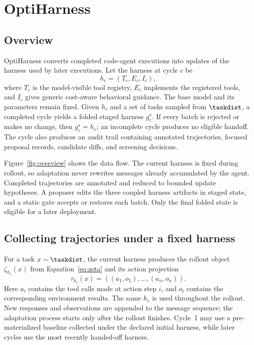 \section{OptiHarness}
\label{sec:method}

\subsection{Overview}

OptiHarness converts completed code-agent executions into updates of the harness used by later executions. Let the harness at cycle $c$ be
\begin{equation}
    h_c=(T_c,E_c,I_c),
\end{equation}
where $T_c$ is the model-visible tool registry, $E_c$ implements the registered tools, and $I_c$ gives generic cost-aware behavioral guidance. The base model and its parameters remain fixed. Given $h_c$ and a set of tasks sampled from $\taskdist$, a completed cycle yields a folded staged harness $g_c^\star$. If every batch is rejected or makes no change, then $g_c^\star=h_c$; an incomplete cycle produces no eligible handoff. The cycle also produces an audit trail containing annotated trajectories, focused proposal records, candidate diffs, and screening decisions.

Figure~\ref{fig:overview} shows the data flow. The current harness is fixed during rollout, so adaptation never rewrites messages already accumulated by the agent. Completed trajectories are annotated and reduced to bounded update hypotheses. A proposer edits the three coupled harness artifacts in staged state, and a static gate accepts or restores each batch. Only the final folded state is eligible for a later deployment.



\subsection{Collecting trajectories under a fixed harness}

For a task $x\sim\taskdist$, the current harness produces the rollout object $\zeta_{h_c}(x)$ from Equation~\ref{eq:zeta} and its action projection
\begin{equation}
    \tau_{h_c}(x)=((a_1,o_1),\ldots,(a_n,o_n)).
\end{equation}
Here $a_i$ contains the tool calls made at action step $i$, and $o_i$ contains the corresponding environment results. The same $h_c$ is used throughout the rollout. New responses and observations are appended to the message sequence; the adaptation process starts only after the rollout finishes. Cycle~1 may use a pre-materialized baseline collected under the declared initial harness, while later cycles use the most recently handed-off harness.

